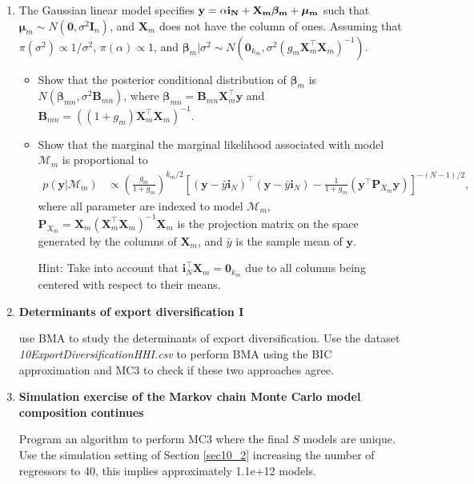 \begin{enumerate}
	\item The Gaussian linear model specifies $\bf{y}=\alpha\bm{i}_N+\bm{X}_m\bm{\beta}_m+\bm{\mu}_m$ such that $\bm{\mu}_m\sim{N}(\bm{0},\sigma^2\bm{I}_n)$, and $\bm{X}_m$ does not have the column of ones. Assuming that $\pi(\sigma^2)\propto 1/{\sigma^2}$, $\pi(\alpha)\propto 1$, and $\bm{\beta}_m|\sigma^2 \sim {N}(\bm{0}_{k_m}, \sigma^2 (g_m\bm{X}_m^{\top}\bm{X}_m)^{-1})$.
	\begin{itemize}
		\item Show that the posterior conditional distribution of $\bm{\beta}_m$ is $N(\bm{\beta}_{mn},\sigma^2\bm{B}_{mn})$, where $\bm{\beta}_{mn}=\bm{B}_{mn}\bm{X}_m^{\top}\bm{y}$ and $\bm{B}_{mn}=((1+g_m)\bm{X}_m^{\top}\bm{X}_m)^{-1}$.
		\item Show that the marginal the marginal likelihood associated with model $\mathcal{M}_m$ is proportional to
		\begin{align*}
			p(\bm{y}|\mathcal{M}_m)&\propto \left(\frac{g_m}{1+g_m}\right)^{k_m/2} \left[(\bm{y}-\bar{y}\bm{i}_N)^{\top}(\bm{y}-\bar{y}\bm{i}_N)-\frac{1}{1+g_m}(\bm{y}^{\top}\bm{P}_{X_m}\bm{y})\right]^{-(N-1)/2},
		\end{align*}
		where all parameter are indexed to model $\mathcal{M}_m$, $\bm{P}_{X_m}=\bm{X}_m(\bm{X}_m^{\top}\bm{X}_m)^{-1}\bm{X}_m$ is the projection matrix on the space generated by the columns of $\bm{X}_m$, and $\bar{y}$ is the sample mean of $\bm{y}$.
		
		Hint: Take into account that $\bm{i}_N^{\top}\bm{X}_m=\bm{0}_{k_m}$ due to all columns being centered with respect to their means.
	\end{itemize}

\item \textbf{Determinants of export diversification I}

\cite{Jetter2015} use BMA to study the determinants of export diversification. Use the dataset \textit{10ExportDiversificationHHI.csv} to perform BMA using the BIC approximation and MC3 to check if these two approaches agree. 

\item \textbf{Simulation exercise of the Markov chain Monte Carlo model composition continues}

Program an algorithm to perform MC3 where the final $S$ models are unique. Use the simulation setting of Section \ref{sec10_2} increasing the number of regressors to 40, this implies approximately 1.1e+12 models.


\end{enumerate}
